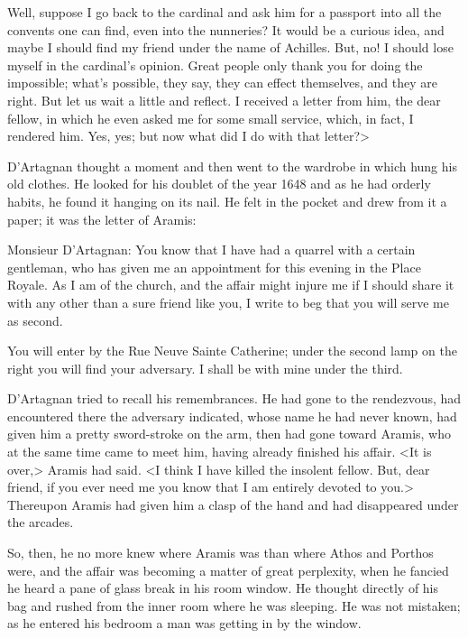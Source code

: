Well, suppose I go back to the cardinal and ask him for a passport into all the convents one can find, even into the nunneries? It would be a curious idea, and maybe I should find my friend under the name of Achilles. But, no! I should lose myself in the cardinal's opinion. Great people only thank you for doing the impossible; what's possible, they say, they can effect themselves, and they are right. But let us wait a little and reflect. I received a letter from him, the dear fellow, in which he even asked me for some small service, which, in fact, I rendered him. Yes, yes; but now what did I do with that letter?>

D'Artagnan thought a moment and then went to the wardrobe in which hung his old clothes. He looked for his doublet of the year 1648 and as he had orderly habits, he found it hanging on its nail. He felt in the pocket and drew from it a paper; it was the letter of Aramis:  

\begin{mail}{}{Monsieur D'Artagnan:}
You know that I have had a quarrel with a certain gentleman, who has given me an appointment for this evening in the Place Royale. As I am of the church, and the affair might injure me if I should share it with any other than a sure friend like you, I write to beg that you will serve me as second.

You will enter by the Rue Neuve Sainte Catherine; under the second lamp on the right you will find your adversary. I shall be with mine under the third. 
\end{mail}

D'Artagnan tried to recall his remembrances. He had gone to the rendezvous, had encountered there the adversary indicated, whose name he had never known, had given him a pretty sword-stroke on the arm, then had gone toward Aramis, who at the same time came to meet him, having already finished his affair. <It is over,> Aramis had said. <I think I have killed the insolent fellow. But, dear friend, if you ever need me you know that I am entirely devoted to you.> Thereupon Aramis had given him a clasp of the hand and had disappeared under the arcades.

So, then, he no more knew where Aramis was than where Athos and Porthos were, and the affair was becoming a matter of great perplexity, when he fancied he heard a pane of glass break in his room window. He thought directly of his bag and rushed from the inner room where he was sleeping. He was not mistaken; as he entered his bedroom a man was getting in by the window.

